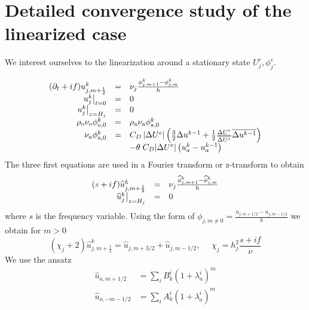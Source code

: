 \section{Detailed convergence study of the linearized case}
\label{appendix:OASchwarz_LinearizedAnalysis}
We interest ourselves to the linearization around a stationary state 
$U^e_j, \phi^e_j$.

\begin{equation*}
\begin{array}{rcll}
	(\partial_t +if) u^{{k}}_{j,m+\frac{1}{2}} &=&
	\nu_j\frac{\phi^{{k}}_{j,m+1} - \phi^{{k}}_{j,m}}{h} \\
	\left.u^{{k}}_j\right|_{t=0} &=& 0 \\
	\left.u^{{k}}_j\right|_{z=H_j} &=& 0\\
	\rho_{\rm o} \nu_{\rm o} \phi^{{k}}_{{\rm o}, 0} &=&
	\rho_{\rm a} \nu_{\rm a} \phi^{{k}}_{{\rm a}, 0} \\
	\nu_a \phi_{{\rm a},0}^{{k}}
	&=& C_D \left|\Delta U^e\right| \left(\frac{3}{2} \Delta u^{
		{k-1}}
	+ \frac{1}{2} \frac{\Delta U^e}{\overline{\Delta U^e}}
		\overline{\Delta u^{
			{{k-1}}}}\right) \\
		&&-{\theta \; C_D|\Delta U^e|
		\left( u_a^{{k}} -
		u_a^{{k-1}}\right)}
\end{array}
\end{equation*}
The three first equations are used in a Fourier transform or
z-transform to obtain
\begin{equation}
\label{eq:FourierTransform}
\begin{array}{rcll}
	(\emphase{s} +if) \widehat{u}^{{k}}_{j,m+\frac{1}{2}} &=&
	\nu_j\frac{\widehat{\phi}^{{k}}_{j,m+1}
	- \widehat{\phi}^{{k}}_{j,m}}{h} \\
	\left.\widehat{u}^{{k}}_j\right|_{z=H_j} &=& 0\\
\end{array}
\end{equation}
where $s$ is the frequency variable.
Using the form of $\phi_{j, m \neq 0} = \frac{u_{j, m+1/2} -
u_{j, m-1/2}}{h}$
we obtain for $m>0$
\begin{equation}
\label{eq:diff_finies_on_u}
	(\chi_j+2) \widehat{u}^{{k}}_{j,m+\frac{1}{2}} =
	\widehat{u}_{j, m+3/2} + \widehat{u}_{j, m-1/2},
	~~~~~~ \chi_j = h_j^2\frac{s + if}{\nu}
\end{equation}
We use the ansatz
\begin{equation*}
\begin{aligned}
\widehat{u}_{a,m+1/2} &= \sum_i B_k^i (1+\lambda_a^i)^m \\
\widehat{u}_{o,-m-1/2} &= \sum_i A_k^i (1+\lambda_o^i)^{m}
\end{aligned}
\end{equation*}
